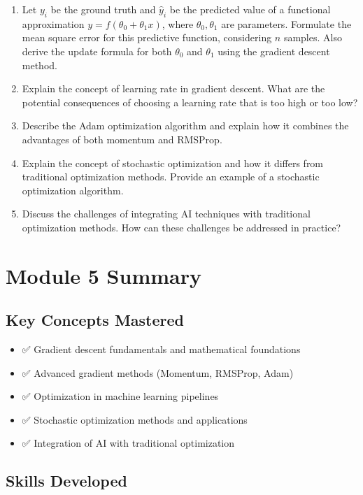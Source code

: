 \documentclass[
  letterpaper,
  DIV=11,
  numbers=noendperiod]{scrreprt}
\providecommand{\tightlist}{%
  \setlength{\itemsep}{0pt}\setlength{\parskip}{0pt}}
\begin{document}
\begin{enumerate}
  with any three dominant advantages and disadvantages.
\item
  Let \(y_i\) be the ground truth and \(\hat{y}_i\) be the predicted
  value of a functional approximation \(y = f(\theta_0 + \theta_1 x)\),
  where \(\theta_0, \theta_1\) are parameters. Formulate the mean square
  error for this predictive function, considering \(n\) samples. Also
  derive the update formula for both \(\theta_0\) and \(\theta_1\) using
  the gradient descent method.
\item
  Explain the concept of learning rate in gradient descent. What are the
  potential consequences of choosing a learning rate that is too high or
  too low?
\item
  Describe the Adam optimization algorithm and explain how it combines
  the advantages of both momentum and RMSProp.
\item
  Explain the concept of stochastic optimization and how it differs from
  traditional optimization methods. Provide an example of a stochastic
  optimization algorithm.
\item
  Discuss the challenges of integrating AI techniques with traditional
  optimization methods. How can these challenges be addressed in
  practice?
\end{enumerate}

\section{Module 5 Summary}\label{module-5-summary}

\subsection{Key Concepts Mastered}\label{key-concepts-mastered-2}

\begin{itemize}
\tightlist
\item
  ✅ Gradient descent fundamentals and mathematical foundations
\item
  ✅ Advanced gradient methods (Momentum, RMSProp, Adam)
\item
  ✅ Optimization in machine learning pipelines
\item
  ✅ Stochastic optimization methods and applications
\item
  ✅ Integration of AI with traditional optimization
\end{itemize}

\subsection{Skills Developed}\label{skills-developed-2}
\end{document}
